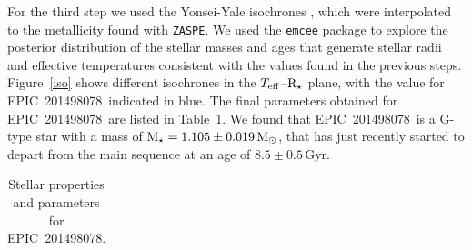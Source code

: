 \documentclass[useAMS,usenatbib]{mnras}
\newcommand{\teff}{\ensuremath{T_{\rm eff}}}
\newcommand{\zaspe}{\texttt{ZASPE}}
\newcommand{\rstar}{\ensuremath{{\rm R}_{\star}}}
\newcommand{\mstar}{\ensuremath{{\rm M}_{\star}}}
\newcommand{\msun}{\ensuremath{{\rm M}_{\odot}}}
\newcommand{\mskep}{\ensuremath{1.105 \pm 0.019 }}
\newcommand{\stname}{EPIC~201498078}
\begin{document}
For the third step we used the Yonsei-Yale isochrones \citep{yi:2001}, which were interpolated
to the metallicity found with \zaspe.
We used the \texttt{emcee} package to explore the
posterior distribution of the stellar masses and
ages that generate stellar radii and effective temperatures consistent with the values found in the previous steps.
Figure~\ref{iso} shows
different isochrones in the  \teff--\rstar{} plane, with the value for \stname\ indicated in blue. 
The final parameters obtained for \stname\ are listed in Table~\ref{tab:stellar}.
We found that \stname\ is a G-type star with a mass of $\mstar=\mskep\,\msun$, that has just recently
started to depart from the main sequence at an age of $8.5 \pm 0.5$\,Gyr.

\begin{table}
 \centering
  \caption{Stellar properties and parameters for \stname.}
  \label{tab:stellar}
  \begin{tabular}{@{}lcc@{}}
  \hline
   

\end{tabular}
\end{table}
\end{document}
